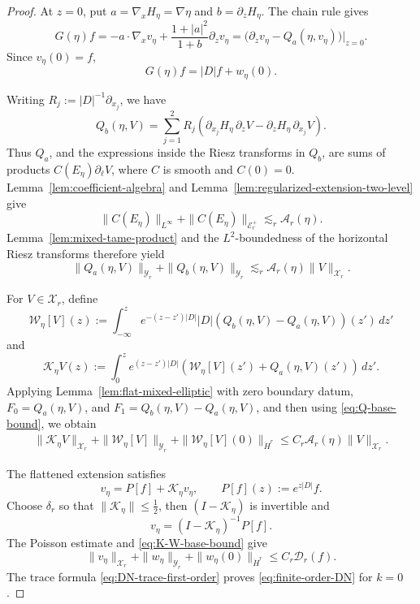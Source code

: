 \documentclass[12pt]{amsart}
\theoremstyle{remark}
\theoremstyle{definition}
\numberwithin{equation}{section}
\begin{document}
\begin{proof}
At \(z=0\), put \(a=\nabla_xH_\eta=\nabla\eta\) and
\(b=\partial_zH_\eta\).  The chain rule gives
\[
 G(\eta)f
 =-a\cdot\nabla_xv_\eta+\frac{1+|a|^2}{1+b}\partial_zv_\eta
 =\bigl(\partial_zv_\eta-Q_a(\eta,v_\eta)\bigr)\big|_{z=0}.
\]
Since \(v_\eta(0)=f\),
\begin{equation}
\label{eq:DN-trace-first-order}
 G(\eta)f=|D|f+w_\eta(0).
\end{equation}

Writing \(R_j:=|D|^{-1}\partial_{x_j}\), we have
\[
 Q_b(\eta,V) = \sum_{j=1}^2 R_j
 \left(  \partial_{x_j}H_\eta\,\partial_zV
  -\partial_zH_\eta\,\partial_{x_j}V
 \right).
\]
Thus \(Q_a\), and the expressions inside the Riesz transforms in
\(Q_b\), are sums of products \(C(E_\eta)\partial_\ell V\), where
\(C\) is smooth and \(C(0)=0\). 
Lemma~\ref{lem:coefficient-algebra} and
Lemma~\ref{lem:regularized-extension-two-level} give
\[
 \|C(E_\eta)\|_{L^\infty} + \|C(E_\eta)\|_{\mathcal E_r^+} \lesssim_r \mathcal A_r(\eta).
\]
Lemma~\ref{lem:mixed-tame-product} and the \(L^2\)-boundedness of the horizontal Riesz transforms therefore yield
\begin{equation}\label{eq:Q-base-bound}
 \|Q_a(\eta,V)\|_{\mathcal Y_r}
 + \|Q_b(\eta,V)\|_{\mathcal Y_r}
 \lesssim_r \mathcal A_r(\eta)\|V\|_{\mathcal X_r}.
\end{equation}

For \(V\in\mathcal X_r\), define
\begin{equation*}
 \mathcal W_\eta[V](z) := \int_{-\infty}^z e^{-(z-z')|D|}|D| \left( Q_b(\eta,V)-Q_a(\eta,V) \right)(z')\,dz'
\end{equation*}
and
\begin{equation*}
 \mathcal K_\eta V(z) := \int_0^z e^{(z-z')|D|} \left( \mathcal W_\eta[V](z') + Q_a(\eta,V)(z') \right)\,dz'.
\end{equation*}
Applying Lemma~\ref{lem:flat-mixed-elliptic} with zero boundary datum,
\(F_0=Q_a(\eta,V)\), and \(F_1=Q_b(\eta,V)-Q_a(\eta,V)\), and then using
\eqref{eq:Q-base-bound}, we obtain
\begin{equation} \label{eq:K-W-base-bound}
\begin{aligned}
 \|\mathcal K_\eta V\|_{\mathcal X_r} + \|\mathcal W_\eta[V]\|_{\mathcal Y_r} + \|\mathcal W_\eta[V](0)\|_{\dot H^r}\leq C_r\mathcal A_r(\eta) \|V\|_{\mathcal X_r}.
\end{aligned}
\end{equation}

The flattened extension satisfies
\begin{equation*}
 v_\eta = P[f]+\mathcal K_\eta v_\eta, \qquad P[f](z):=e^{z|D|}f.
\end{equation*}
Choose \(\delta_r\) so that \(\|\mathcal K_\eta\| \leq\frac12\), then $(I-\mathcal K_\eta)$ is invertible and
\[
 v_\eta = (I-\mathcal K_\eta)^{-1}P[f].
\]
The Poisson estimate and \eqref{eq:K-W-base-bound} give
\begin{equation*}
 \|v_\eta\|_{\mathcal X_r} + \|w_\eta\|_{\mathcal Y_r} + \|w_\eta(0)\|_{\dot H^r} \leq C_r\mathcal D_r(f).
\end{equation*}
The trace formula \eqref{eq:DN-trace-first-order} proves
\eqref{eq:finite-order-DN} for \(k=0\).


\end{proof}
\end{document}

